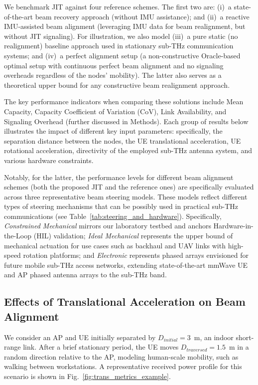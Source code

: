 \documentclass[fleqn,10pt]{wlscirep}
\begin{document}
We benchmark JIT against four reference schemes. The first two are: (i)~a state-of-the-art beam recovery approach (without IMU assistance); and (ii)~a reactive IMU-assisted beam alignment (leveraging IMU data for beam realignment, but without JIT signaling). For illustration, we also model (iii)~a pure static (no realignment) baseline approach used in stationary sub-THz communication systems; and (iv)~a perfect alignment setup (a non-constructive Oracle-based optimal setup with continuous perfect beam alignment and no signaling overheads regardless of the nodes' mobility). The latter also serves as a theoretical upper bound for any constructive beam realignment approach.

The key performance indicators when comparing these solutions include Mean Capacity, Capacity Coefficient of Variation (CoV), Link Availability, and Signaling Overhead (further discussed in Methods). Each group of results below illustrates the impact of different key input parameters: specifically, the separation distance between the nodes, the UE translational acceleration, UE rotational acceleration, directivity of the employed sub-THz antenna system, and various hardware constraints.

Notably, for the latter, the performance levels for different beam alignment schemes (both the proposed JIT and the reference ones) are specifically evaluated across three representative beam steering models. These models reflect different types of steering mechanisms that can be possibly used in practical sub-THz communications (see Table~\ref{tab:steering_and_hardware}). Specifically, \textit{Constrained Mechanical} mirrors our laboratory testbed and anchors Hardware-in-the-Loop (HIL) validation; \textit{Ideal Mechanical} represents the upper bound of mechanical actuation for use cases such as backhaul and UAV links with high-speed rotation platforms; and \textit{Electronic} represents phased arrays envisioned for future mobile sub-THz access networks, extending state-of-the-art mmWave UE and AP phased antenna arrays to the sub-THz band.



\subsection*{Effects of Translational Acceleration on Beam Alignment}

We consider an AP and UE initially separated by $D_{initial} = 3$~m, an indoor short-range link\cite{9013236}. After a brief stationary period, the UE moves $D_{traversed} = 1.5$~m in a random direction relative to the AP, modeling human-scale mobility, such as walking between workstations. A representative received power profile for this scenario is shown in Fig.~\ref{fig:trans_metrics_example}.
\end{document}
